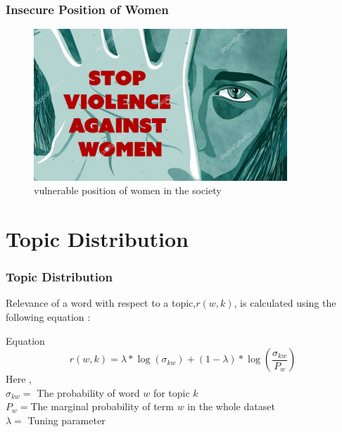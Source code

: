 \documentclass{beamer}
\begin{document}
\begin{frame}
\frametitle{Insecure Position of Women}
\begin{figure}[h]
	\centering
	\includegraphics[width=0.85\textwidth]{abuse.jpg}
	\newline
	\caption{vulnerable position of women in the society}
\end{figure}
\end{frame}\section{Topic Distribution}
\begin{frame}
\frametitle{Topic Distribution}
Relevance of a word with respect to a topic,$r(w, k)$, is calculated using the following equation :
\begin{block}{Equation}
\begin{equation*}
r(w,k) = \lambda * \log(\sigma_{kw}) + (1 - \lambda)*\log\left(\frac{\sigma_{kw}}{P_w}\right)
\end{equation*}
Here ,\\ $\sigma_{kw} = $  The probability of word $w$ for topic $k$ \\ $P_w = $The marginal probability of term $w$ in the whole dataset\\$\lambda = $ Tuning parameter
\end{block}

\end{frame}
\end{document}
